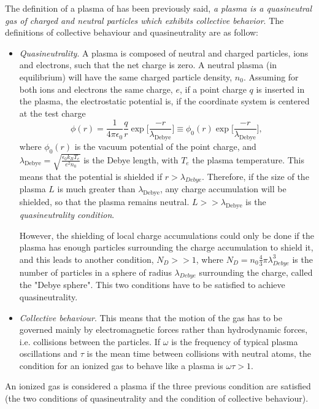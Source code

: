 \documentclass[a4paper,12pt,oneside]{book}
\begin{document}
The definition of a plasma of \cite{Chen} has been previously said, \textit{a plasma is a quasineutral gas of charged and neutral particles which exhibits collective behavior}. The definitions of collective behaviour and quasineutrality are as follow:%
%
\begin{itemize}

\item \textit{Quasineutrality}. A plasma is composed of neutral and charged particles, ions and electrons, such that the net charge is zero. A neutral plasma (in equilibrium) will have the same charged particle density, $n_0$. Assuming for both ions and electrons the same charge, $e$, if a point charge $q$ is inserted in the plasma, the electrostatic potential is, if the coordinate system is centered at the test charge
%
\begin{equation}
\phi(r)=\dfrac{1}{4 \pi \epsilon_0}\dfrac{q}{r} \exp \Big[\frac{-r}{\lambda_{\text{Debye}}} \Big] \equiv \phi_0(r) \exp \Big[\frac{-r}{\lambda_{\text{Debye}}} \Big],
\end{equation}
%
where $\phi_0(r)$ is the vacuum potential of the point charge, and $\lambda_{\text{Debye}}=\sqrt{\frac{\epsilon_0 k_B T_e}{e^2 n_0}}$ is the Debye length, with $T_e$ the plasma temperature. This means that the potential is shielded if $r> \lambda_{Debye}$. Therefore, if the size of the plasma $L$ is much greater than $\lambda_{\text{Debye}}$, any charge accumulation will be shielded, so that the plasma remains neutral. $L>>\lambda_{\text{Debye}}$ is the\textit{ quasineutrality condition}. 

However, the shielding of local charge accumulations could only be done if the plasma has enough particles surrounding the charge accumulation to shield it, and this leads to another condition, $N_D>>1$, where $N_D=n_0 \frac{4}{3} \pi  \lambda_{Debye}^3$ is the number of particles in a sphere of radius $\lambda_{Debye}$ surrounding the charge, called the "Debye sphere". This two conditions have to be satisfied to achieve quasineutrality.

\item \textit{Collective behaviour}. This means that the motion of the gas has to be governed mainly by electromagnetic forces rather than hydrodynamic forces, i.e. collisions between the particles. If $\omega$ is the frequency of typical plasma oscillations and $\tau$ is the mean time between collisions with neutral atoms, the condition for an ionized gas to behave like a plasma is $\omega \tau>1$.

\end{itemize}
%
An ionized gas is considered a plasma if the three previous condition are satisfied (the two conditions of quasineutrality and the condition of collective behaviour).
\end{document}
